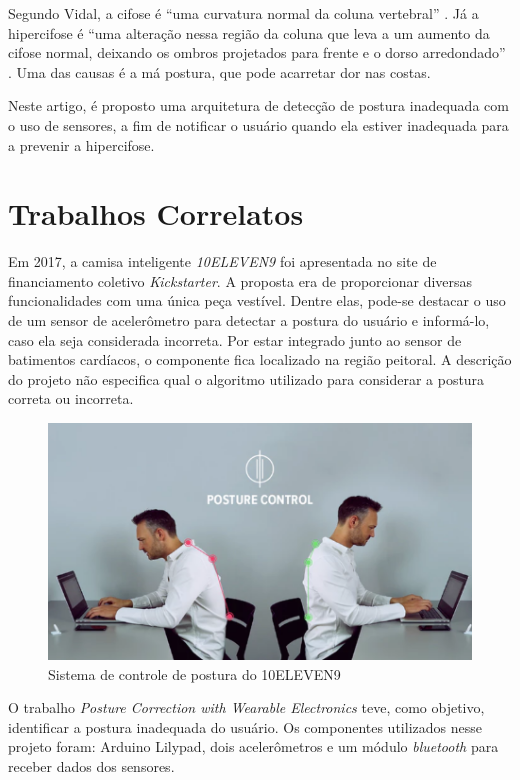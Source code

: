 \documentclass[12pt]{article}
\begin{document}
Segundo Vidal, a cifose é “uma curvatura normal da coluna vertebral” \cite{vidal:17}. Já a hipercifose é “uma alteração nessa região da coluna que leva a um aumento da cifose normal, deixando os ombros projetados para frente e o dorso arredondado” \cite{vidal:17}. Uma das causas é a má postura, que pode acarretar dor nas costas.

Neste artigo, é proposto uma arquitetura de detecção de postura inadequada com o uso de sensores, a fim de notificar o usuário quando ela estiver inadequada para a prevenir a hipercifose.

\section{Trabalhos Correlatos}
Em 2017, a camisa inteligente \textit{10ELEVEN9} \cite{colorfy:17} foi apresentada no site de financiamento coletivo \textit{Kickstarter}. A proposta era de proporcionar diversas funcionalidades com uma única peça vestível. Dentre elas, pode-se destacar o uso de um sensor de acelerômetro para detectar a postura do usuário e informá-lo, caso ela seja considerada incorreta. Por estar integrado junto ao sensor de batimentos cardíacos, o componente fica localizado na região peitoral. A descrição do projeto não especifica qual o algoritmo utilizado para considerar a postura correta ou incorreta.

\begin{figure}[ht]
\centering
\includegraphics{fig2.png}
\caption{Sistema de controle de postura do 10ELEVEN9}
\label{fig:example2}
\end{figure}

O trabalho \textit{Posture Correction with Wearable Electronics} \cite{rubow:08} teve, como objetivo, identificar a postura inadequada do usuário. Os componentes utilizados nesse projeto foram: Arduino Lilypad, dois acelerômetros e um módulo \textit{bluetooth} para receber dados dos sensores.
\end{document}
